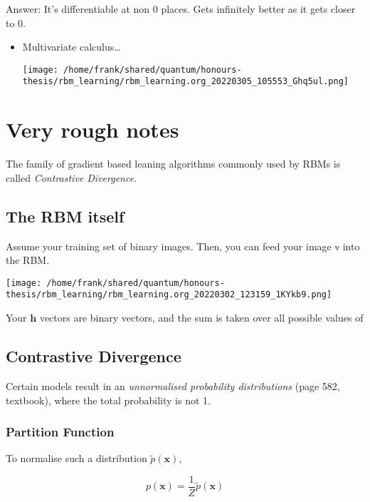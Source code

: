 \documentclass[11pt]{article}
\begin{document}
Answer: It's differentiable at non 0 places. Gets infinitely better as it gets closer to 0.

\begin{itemize}
\item Multivariate calculus\ldots{}
\begin{center}
\texttt{[image: /home/frank/shared/quantum/honours-thesis/rbm\_learning/rbm\_learning.org\_20220305\_105553\_Ghq5ul.png]}
\end{center}
\end{itemize}

\section{Very rough notes}
\label{sec:orgb99592e}
The family of gradient based leaning algorithms commonly used by RBMs is called \emph{Contrastive Divergence}.

\subsection{The RBM itself}
\label{sec:org44d53cb}
Assume your training set of binary images. Then, you can feed your image \(\mathbb{v}\) into the RBM.

\begin{center}
\texttt{[image: /home/frank/shared/quantum/honours-thesis/rbm\_learning/rbm\_learning.org\_20220302\_123159\_1KYkb9.png]}
\end{center}

Your \(\mathbf{h}\) vectors are binary vectors, and the sum is taken over all possible values of


\subsection{Contrastive Divergence}
\label{sec:org64ba6ab}
Certain models result in an \emph{unnormalised probability distributions} (page 582, textbook), where the total probability is not 1.

\subsubsection{Partition Function}
\label{sec:org8317547}
To normalise such a distribution \(\tilde{p}(\mathbf{x})\),

\begin{equation}
p(\mathbf{x}) = \frac{1}{Z} \tilde{p}(\mathbf{x})
\end{equation}
\end{document}
